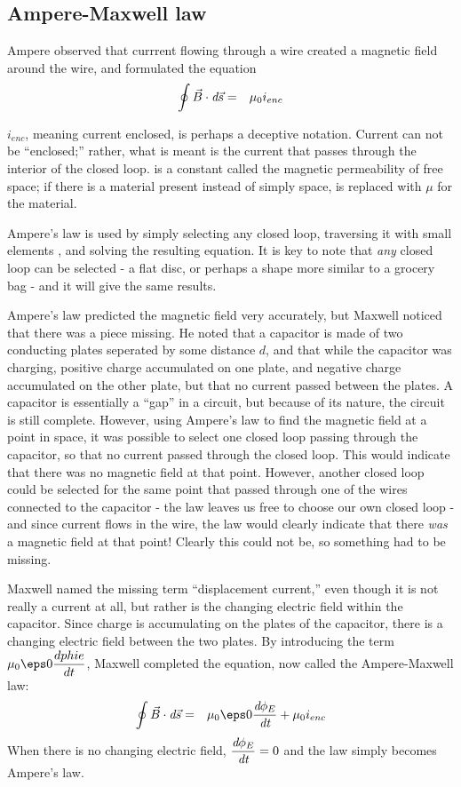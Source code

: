 \documentclass[12pt]{article}
\begin{document}
\subsection{Ampere-Maxwell law}

Ampere observed that currrent flowing through a wire created a magnetic field around the wire, and formulated the equation
\begin{eqnarray}
\oint{\vec{B}\cdot\ensuremath{\emph{d}\vec{s}}}&=&\mu_0 i_{enc}
\end{eqnarray}

$i_{enc}$, meaning current enclosed, is perhaps a deceptive notation. Current can not be ``enclosed;'' rather, what is meant is the current that passes through the interior of the closed loop. \muz is a constant called the magnetic permeability of free space; if there is a material present instead of simply space, \muz is replaced with $\mu$ for the material.

Ampere's law is used by simply selecting any closed loop, traversing it with small elements \ds, and solving the resulting equation. It is key to note that \textit{any} closed loop can be selected - a flat disc, or perhaps a shape more similar to a grocery bag - and it will give the same results.

Ampere's law predicted the magnetic field very accurately, but Maxwell noticed that there was a piece missing. He noted that a capacitor is made of two conducting plates seperated by some distance $d$, and that while the capacitor was charging, positive charge accumulated on one plate, and negative charge accumulated on the other plate, but that no current passed between the plates. A capacitor is essentially a ``gap'' in a circuit, but because of its nature, the circuit is still complete. However, using Ampere's law to find the magnetic field at a point in space, it was possible to select one closed loop passing through the capacitor, so that no current passed through the closed loop. This would indicate that there was no magnetic field at that point. However, another closed loop could be selected for the same point that passed through one of the wires connected to the capacitor - the law leaves us free to choose our own closed loop - and since current flows in the wire, the law would clearly indicate that there \textit{was} a magnetic field at that point! Clearly this could not be, so something had to be missing.

Maxwell named the missing term ``displacement current,'' even though it is not really a current at all, but rather is the changing electric field within the capacitor. Since charge is accumulating on the plates of the capacitor, there is a changing electric field between the two plates. By introducing the term $\displaystyle\muz\eps0\frac{dphie}{dt}$, Maxwell completed the equation, now called the Ampere-Maxwell law:
\begin{eqnarray*}
\displaystyle\oint{\vec{B}\cdot\ds}&=&\muz\eps0\frac{\dphie}{\dt}+\muz i_{enc}
\end{eqnarray*}
When there is no changing electric field, $\displaystyle\frac{\emph{d}\phi_E}{\emph{dt}}=0$ and the law simply becomes Ampere's law.
\end{document}
